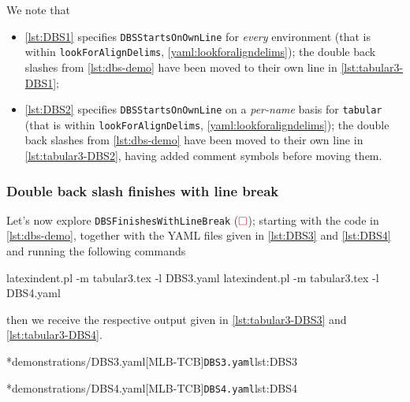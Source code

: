 	We note that
	\begin{itemize}
		\item \cref{lst:DBS1} specifies \texttt{DBSStartsOnOwnLine} for
		      \emph{every} environment (that is within \texttt{lookForAlignDelims},
		      \vref{yaml:lookforaligndelims});
		      the double back slashes from \cref{lst:dbs-demo} have been moved to their own
		      line in \cref{lst:tabular3-DBS1};
		\item \cref{lst:DBS2} specifies \texttt{DBSStartsOnOwnLine} on a
		      \emph{per-name} basis for \texttt{tabular} (that is within \texttt{lookForAlignDelims}, \vref{yaml:lookforaligndelims});
		      the double back slashes from \cref{lst:dbs-demo} have been moved to their own
		      line in \cref{lst:tabular3-DBS2}, having added comment symbols before moving them.
	\end{itemize}

\subsubsection{Double back slash finishes with line break}
	Let's now explore \texttt{DBSFinishesWithLineBreak} ($\color{red}\square$); starting with the code in
	\cref{lst:dbs-demo}, together with the YAML files given in
	\cref{lst:DBS3} and \cref{lst:DBS4} and running the following
	commands
	\begin{commandshell}
latexindent.pl -m tabular3.tex -l DBS3.yaml
latexindent.pl -m tabular3.tex -l DBS4.yaml
            \end{commandshell}
	then we receive the respective output given in \cref{lst:tabular3-DBS3} and
	\cref{lst:tabular3-DBS4}.

	\begin{cmhtcbraster}[raster column skip=.01\linewidth]
		\cmhlistingsfromfile*[style=yaml-LST]*{demonstrations/DBS3.yaml}[MLB-TCB]{\texttt{DBS3.yaml}}{lst:DBS3}
	\end{cmhtcbraster}

	\begin{cmhtcbraster}[raster column skip=.01\linewidth]
		\cmhlistingsfromfile*[style=yaml-LST]*{demonstrations/DBS4.yaml}[MLB-TCB]{\texttt{DBS4.yaml}}{lst:DBS4}
	\end{cmhtcbraster}

